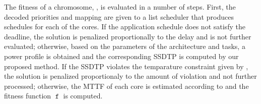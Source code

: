 The fitness of a chromosome, , is evaluated in a number of steps. First, the decoded priorities and mapping are given to a list scheduler that produces schedules for each of the cores. If the application schedule does not satisfy the deadline, the solution is penalized proportionally to the delay and is not further evaluated; otherwise, based on the parameters of the architecture and tasks, a power profile is obtained and the corresponding SSDTP is computed by our proposed method. If the SSDTP violates the temparature constraint given by , the solution is penalized proportionaly to the amount of violation and not further processed; otherwise, the MTTF of each core is estimated according to  and the fitness function $\mttf$ is computed.
